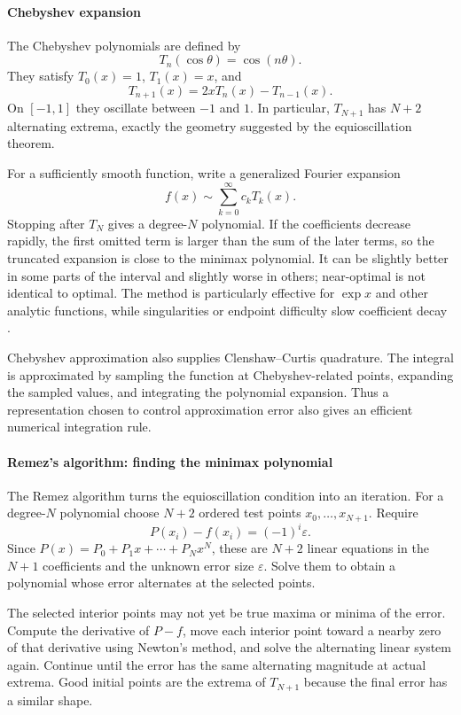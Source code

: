 \paragraph{Chebyshev expansion}

The Chebyshev polynomials are defined by
\[
 T_n(\cos\theta)=\cos(n\theta).
\]
They satisfy $T_0(x)=1$, $T_1(x)=x$, and
\[
 T_{n+1}(x)=2xT_n(x)-T_{n-1}(x).
\]
On $[-1,1]$ they oscillate between $-1$ and $1$. In particular, $T_{N+1}$ has $N+2$ alternating extrema, exactly the geometry suggested by the equioscillation theorem.

For a sufficiently smooth function, write a generalized Fourier expansion
\[
 f(x)\sim\sum_{k=0}^{\infty}c_kT_k(x).
\]
Stopping after $T_N$ gives a degree-$N$ polynomial. If the coefficients decrease rapidly, the first omitted term is larger than the sum of the later terms, so the truncated expansion is close to the minimax polynomial. It can be slightly better in some parts of the interval and slightly worse in others; near-optimal is not identical to optimal. The method is particularly effective for $\exp x$ and other analytic functions, while singularities or endpoint difficulty slow coefficient decay \cite{approximation_theory_ref4,approximation_theory_ref5}.

Chebyshev approximation also supplies Clenshaw--Curtis quadrature. The integral is approximated by sampling the function at Chebyshev-related points, expanding the sampled values, and integrating the polynomial expansion. Thus a representation chosen to control approximation error also gives an efficient numerical integration rule.

\paragraph{Remez's algorithm: finding the minimax polynomial}

The Remez algorithm turns the equioscillation condition into an iteration. For a degree-$N$ polynomial choose $N+2$ ordered test points $x_0,\ldots,x_{N+1}$. Require
\[
 P(x_i)-f(x_i)=(-1)^i\varepsilon.
\]
Since $P(x)=P_0+P_1x+\cdots+P_Nx^N$, these are $N+2$ linear equations in the $N+1$ coefficients and the unknown error size $\varepsilon$. Solve them to obtain a polynomial whose error alternates at the selected points.

The selected interior points may not yet be true maxima or minima of the error. Compute the derivative of $P-f$, move each interior point toward a nearby zero of that derivative using Newton's method, and solve the alternating linear system again. Continue until the error has the same alternating magnitude at actual extrema. Good initial points are the extrema of $T_{N+1}$ because the final error has a similar shape.

